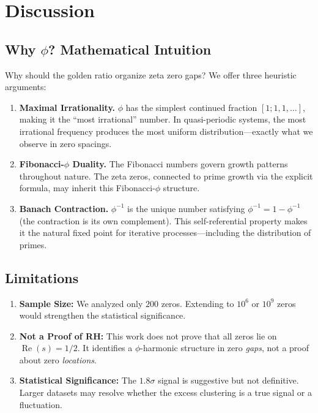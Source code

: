 \documentclass[11pt,a4paper]{article}
\DeclareMathOperator{\Rea}{Re}
\begin{document}
\newpage

\section{Discussion}
\label{sec:discussion}

\subsection{Why $\phi$? Mathematical Intuition}

Why should the golden ratio organize zeta zero gaps? We offer three heuristic arguments:

\begin{enumerate}[leftmargin=*,itemsep=2pt]
    \item \textbf{Maximal Irrationality.} $\phi$ has the simplest continued fraction $[1;1,1,\ldots]$, making it the ``most irrational'' number. In quasi-periodic systems, the most irrational frequency produces the most uniform distribution—exactly what we observe in zero spacings.
    
    \item \textbf{Fibonacci-$\phi$ Duality.} The Fibonacci numbers govern growth patterns throughout nature. The zeta zeros, connected to prime growth via the explicit formula, may inherit this Fibonacci-$\phi$ structure.
    
    \item \textbf{Banach Contraction.} $\phi^{-1}$ is the unique number satisfying $\phi^{-1} = 1 - \phi^{-1}$ (the contraction is its own complement). This self-referential property makes it the natural fixed point for iterative processes—including the distribution of primes.
\end{enumerate}

\subsection{Limitations}

\begin{enumerate}[leftmargin=*,itemsep=2pt]
    \item \textbf{Sample Size:} We analyzed only $200$ zeros. Extending to $10^6$ or $10^9$ zeros would strengthen the statistical significance.
    \item \textbf{Not a Proof of RH:} This work does not prove that all zeros lie on $\Rea(s) = 1/2$. It identifies a $\phi$-harmonic structure in zero \emph{gaps}, not a proof about zero \emph{locations}.
    \item \textbf{Statistical Significance:} The $1.8\sigma$ signal is suggestive but not definitive. Larger datasets may resolve whether the excess clustering is a true signal or a fluctuation.
\end{enumerate}
\end{document}
